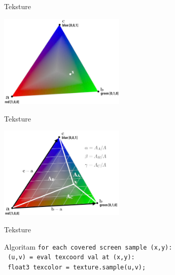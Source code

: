 \documentclass[9pt]{beamer}
\begin{document}
\begin{frame}{Teksture}
	\begin{center}
		\includegraphics[width=6cm]{./slike/slide_024.jpg}
	\end{center}
\end{frame}


\begin{frame}{Teksture}
	\begin{center}
		\includegraphics[width=6cm]{./slike/slide_029.jpg}
	\end{center}
\end{frame}

\begin{frame}{Teksture}
	\begin{block}{Algoritam}
		\texttt{for each covered screen sample (x,y):}\\
		\texttt{\ (u,v) = eval texcoord val at (x,y):}\\
		\texttt{\ float3 texcolor = texture.sample(u,v);} \\
	\end{block}
\end{frame}
\end{document}
